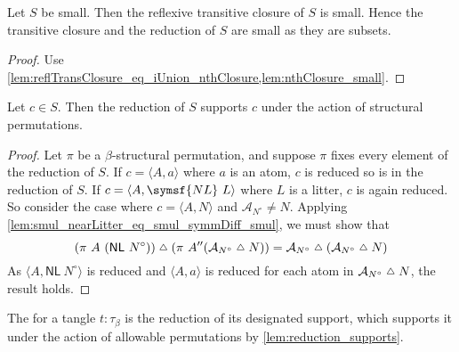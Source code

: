 \begin{lemma}
    Let \( S \) be small.
    Then the reflexive transitive closure of \( S \) is small.
    Hence the transitive closure and the reduction of \( S \) are small as they are subsets.
\end{lemma}
\begin{proof}
    Use \cref{lem:reflTransClosure_eq_iUnion_nthClosure,lem:nthClosure_small}.
\end{proof}
\begin{lemma}
    \label{lem:reduction_supports}
    Let \( c \in S \).
    Then the reduction of \( S \) supports \( c \) under the action of structural permutations.
\end{lemma}
\begin{proof}
    Let \( \pi \) be a \( \beta \)-structural permutation, and suppose \( \pi \) fixes every element of the reduction of \( S \).
    If \( c = \langle A, a \rangle \) where \( a \) is an atom, \( c \) is reduced so is in the reduction of \( S \).
    If \( c = \langle A, \symsf{NL}\ L \rangle \) where \( L \) is a litter, \( c \) is again reduced.
    So consider the case where \( c = \langle A, N \rangle \) and \( \mathcal A_{N^\circ} \neq N \).
    Applying \cref{lem:smul_nearLitter_eq_smul_symmDiff_smul}, we must show that
    \[ (\pi\ A\ (\mathsf{NL}\ N^\circ)) \symmdiff ({\pi\ A} '' (\mathcal A_{N^\circ} \symmdiff N)) = \mathcal A_{N^\circ} \symmdiff (\mathcal A_{N^\circ} \symmdiff N) \]
    As \( \langle A, \mathsf{NL}\ N^\circ \rangle \) is reduced and \( \langle A, a \rangle \) is reduced for each atom in \( \mathcal A_{N^\circ} \symmdiff N \), the result holds.
\end{proof}
\begin{definition}
    The  for a tangle \( t : \tau_\beta \) is the reduction of its designated support, which supports it under the action of allowable permutations by \cref{lem:reduction_supports}.
\end{definition}
